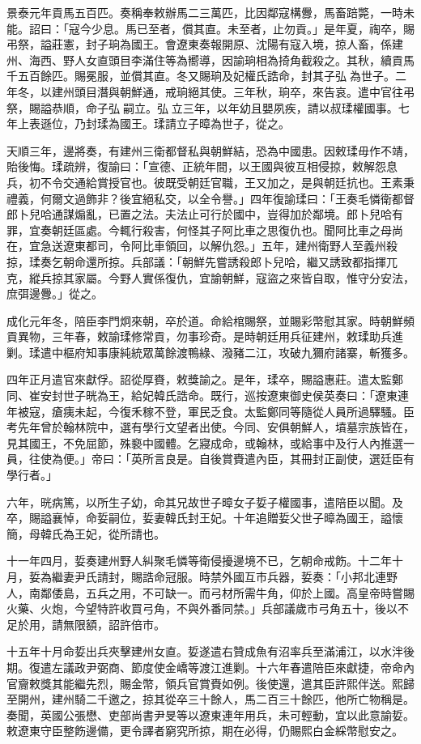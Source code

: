 \begin{pinyinscope}
景泰元年貢馬五百匹。奏稱奉敕辦馬二三萬匹，比因鄰寇構釁，馬畜踣斃，一時未能。詔曰：「寇今少息。馬已至者，償其直。未至者，止勿貢。」是年夏，祹卒，賜弔祭，謚莊憲，封子珦為國王。會遼東奏報開原、沈陽有寇入境，掠人畜，係建州、海西、野人女直頭目李滿住等為嚮導，因諭珦相為掎角截殺之。其秋，續貢馬千五百餘匹。賜冕服，並償其直。冬又賜珦及妃權氏誥命，封其子弘為世子。二年冬，以建州頭目潛與朝鮮通，戒珦絕其使。三年秋，珦卒，來告哀。遣中官往弔祭，賜謚恭順，命子弘嗣立。弘立三年，以年幼且嬰夙疾，請以叔瑈權國事。七年上表遜位，乃封瑈為國王。瑈請立子暲為世子，從之。

天順三年，邊將奏，有建州三衛都督私與朝鮮結，恐為中國患。因敕瑈毋作不靖，貽後悔。瑈疏辨，復諭曰：「宣德、正統年間，以王國與彼互相侵掠，敕解怨息兵，初不令交通給賞授官也。彼既受朝廷官職，王又加之，是與朝廷抗也。王素秉禮義，何爾文過飾非？後宜絕私交，以全令譽。」四年復諭瑈曰：「王奏毛憐衛都督郎卜兒哈通謀煽亂，已置之法。夫法止可行於國中，豈得加於鄰境。郎卜兒哈有罪，宜奏朝廷區處。今輒行殺害，何怪其子阿比車之思復仇也。聞阿比車之母尚在，宜急送遼東都司，令阿比車領回，以解仇怨。」五年，建州衛野人至義州殺掠，瑈奏乞朝命還所掠。兵部議：「朝鮮先嘗誘殺郎卜兒哈，繼又誘致都指揮兀克，縱兵掠其家屬。今野人實係復仇，宜諭朝鮮，寇盜之來皆自取，惟守分安法，庶弭邊釁。」從之。

成化元年冬，陪臣李門炯來朝，卒於道。命給棺賜祭，並賜彩幣慰其家。時朝鮮頻貢異物，三年春，敕諭瑈修常貢，勿事珍奇。是時朝廷用兵征建州，敕瑈助兵進剿。瑈遣中樞府知事康純統眾萬餘渡鴨綠、潑豬二江，攻破九獮府諸寨，斬獲多。

四年正月遣官來獻俘。詔從厚賚，敕獎諭之。是年，瑈卒，賜謚惠莊。遣太監鄭同、崔安封世子晄為王，給妃韓氏誥命。既行，巡按遼東御史侯英奏曰：「遼東連年被寇，瘡痍未起，今復禾稼不登，軍民乏食。太監鄭同等隨從人員所過驛騷。臣考先年曾於翰林院中，選有學行文望者出使。今同、安俱朝鮮人，墳墓宗族皆在，見其國王，不免屈節，殊褻中國體。乞寢成命，或翰林，或給事中及行人內推選一員，往使為便。」帝曰：「英所言良是。自後賞賚遣內臣，其冊封正副使，選廷臣有學行者。」

六年，晄病篤，以所生子幼，命其兄故世子暲女子娎子權國事，遣陪臣以聞。及卒，賜謚襄悼，命娎嗣位，娎妻韓氏封王妃。十年追贈娎父世子暲為國王，謚懷簡，母韓氏為王妃，從所請也。

十一年四月，娎奏建州野人糾聚毛憐等衛侵擾邊境不已，乞朝命戒飭。十二年十月，娎為繼妻尹氏請封，賜誥命冠服。時禁外國互市兵器，娎奏：「小邦北連野人，南鄰倭島，五兵之用，不可缺一。而弓材所需牛角，仰於上國。高皇帝時嘗賜火藥、火炮，今望特許收買弓角，不與外番同禁。」兵部議歲市弓角五十，後以不足於用，請無限額，詔許倍市。

十五年十月命娎出兵夾擊建州女直。娎遂遣右贊成魚有沼率兵至滿浦江，以水泮後期。復遣左議政尹弼商、節度使金嶠等渡江進剿。十六年春遣陪臣來獻捷，帝命內官齎敕獎其能繼先烈，賜金幣，領兵官賞賚如例。後使還，遣其臣許熙伴送。熙歸至開州，建州騎二千邀之，掠其從卒三十餘人，馬二百三十餘匹，他所亡物稱是。奏聞，英國公張懋、吏部尚書尹旻等以遼東連年用兵，未可輕動，宜以此意諭娎。敕遼東守臣整飭邊備，更令譯者窮究所掠，期在必得，仍賜熙白金綵幣慰安之。


\end{pinyinscope}
